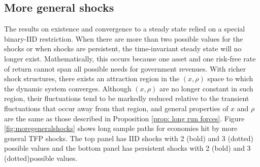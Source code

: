 \documentclass[thmsb,11pt]{article}
\newtheorem{proposition}{Proposition}
\begin{document}
%
%
%
%
%
%
%
%
%
\color{black}
\subsection{More general shocks} \label{Sec: More General Shocks}
The results on existence and convergence to a steady state relied on a special binary-IID restriction. When there are more than two possible values for the shocks or when
shocks are persistent, the time-invariant steady state  will no longer
exist. Mathematically, this occurs because one asset and one risk-free rate
of return cannot span all possible needs for government revenues. With
richer shock structures, there exists an attraction region in the  $(x,\rho)$ space   to which the dynamic
system  converges. Although $\left( x,\rho \right) $ are no longer
constant in such region, their fluctuations tend to be markedly
reduced relative to the transient fluctuations that occur away from that region, and general properties of $x$ and $\rho$ are the same as those
described in Proposition \ref{prop: long run forces}. Figure \ref{fig:moregeneralshocks} shows long sample paths for economies hit by more general TFP shocks. The top panel has IID shocks with 2 (bold) and 3 (dotted) possible values and the bottom panel has persistent shocks with 2 (bold) and 3 (dotted)possible values.
\end{document}
